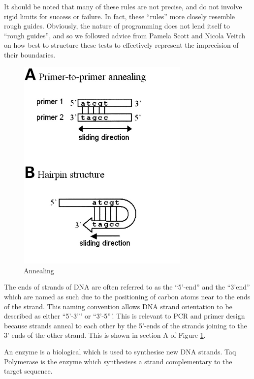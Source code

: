 It should be noted that many of these rules are not precise, and do
not involve rigid limits for success or failure.
In fact, these ``rules'' more closely resemble rough guides.
Obviously, the nature of programming does not lend itself to ``rough
guides'', and so we followed advice from Pamela Scott and Nicola
Veitch on how best to structure these tests to effectively represent
the imprecision of their boundaries.

\begin{figure}[h]
  \begin{center}
    \includegraphics[width=0.75\textwidth]{./images/other/annealing.jpg}
    \caption{
      \label{fig:other:anneal}
      Annealing	
    }
  \end{center}
\end{figure}

The ends of strands of DNA are often referred to as the ``5'-end'' and
the ``3'end'' which are named as such due to the positioning of carbon
atoms near to the ends of the strand. This naming convention allows DNA
strand orientation to be described as either ``5'-3''' or ``3'-5'''.
This is relevant to PCR and primer design because strands anneal to
each other by the 5'-ends of the strands joining to the 3'-ends of the
other strand. This is shown in section A of Figure
\ref{fig:other:anneal}.

An enzyme is a biological which is used to synthesise new DNA
strands. Taq Polymerase is the enzyme which synthesises a strand
complementary to the target sequence.










